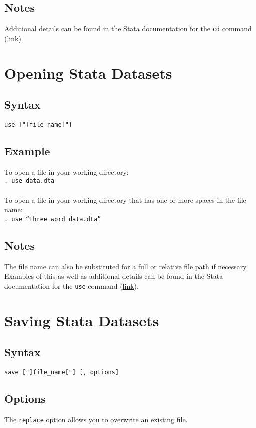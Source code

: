 \documentclass[letterpaper,11pt]{article}
\begin{document}
\subsection{Notes}
Additional details can be found in the Stata documentation for the \texttt{{\color{Red}cd}}  command (\href{http://www.stata.com/manuals14/dcd.pdf}{link}).\\
\newpage
\section{Opening Stata Datasets}
\subsection{Syntax}
\texttt{{\color{Red}use} ["]file\_name["]}\\
\subsection{Example}
To open a file in your working directory: \\
\texttt{. {\color{Red}use} data.dta}  \\
\\
To open a file in your working directory that has one or more spaces in the file name: \\
\texttt{. {\color{Red}use} ``three word data.dta''}  \\
\subsection{Notes}
The file name can also be substituted for a full or relative file path if necessary. Examples of this as well as additional details can be found in the Stata documentation for the \texttt{{\color{Red}use}} command (\href{http://www.stata.com/manuals14/duse.pdf}{link}).\\
\newpage
\section{Saving Stata Datasets}
\subsection{Syntax}
\texttt{{\color{Red}save} ["]file\_name["] [, options]}\\

\subsection{Options}
The \texttt{replace} option allows you to overwrite an existing file.
\end{document}
